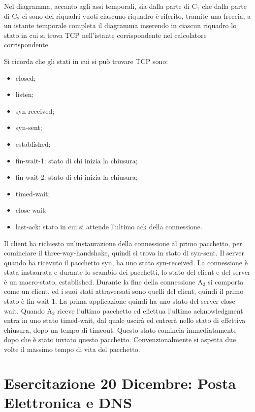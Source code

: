 \documentclass{article}
\numberwithin{equation}{subsection}
\begin{document}
Nel diagramma, accanto agli assi temporali, sia dalla parte di C$_1$ che dalla parte di C$_2$ ci sono dei riquadri vuoti ciascuno riquadro è riferito, tramite una freccia, 
a un istante temporale completa il diagramma inserendo in ciascun riquadro lo stato in cui si trova TCP nell'istante corrispondente nel calcolatore corrispondente. 

Si ricorda che gli stati in cui si può trovare TCP sono:
\begin{itemize}
    \item closed;
    \item listen;
    \item syn-received;
    \item syn-sent;
    \item established;
    \item fin-wait-1: stato di chi inizia la chiusura;
    \item fin-wait-2: stato di chi inizia la chiusura;
    \item timed-wait;
    \item close-wait;
    \item last-ack: stato in cui si attende l'ultimo ack della connessione.
\end{itemize}

Il client ha richiesto un'instaurazione della connessione al primo pacchetto, per cominciare il three-way-handshake, quindi si trova in stato di syn-sent. Il server 
quando ha ricevuto il pacchetto syn, ha uno stato syn-received. 
La connessione è stata instaurata e durante lo scambio dei pacchetti, lo stato del client e del server è un macro-stato, established. 
Durante la fine della connessione A$_2$ si comporta come un client, ed i suoi stati attraversati sono quelli del client, quindi il primo stato è fin-wait-1. La prima 
applicazione quindi ha uno stato del server close-wait. 
Quando A$_2$ riceve l'ultimo pacchetto ed effettua l'ultimo acknowledgment entra in uno stato timed-wait, dal quale uscirà ed entrerà nello stato di effettiva chiusura, 
dopo un tempo di timeout. Questo stato comincia immediatamente dopo che è stato inviato questo pacchetto. Convenzionalmente si aspetta due volte il massimo tempo di vita 
del pacchetto. 

\clearpage

\section{Esercitazione 20 Dicembre: Posta Elettronica e DNS}
\end{document}
